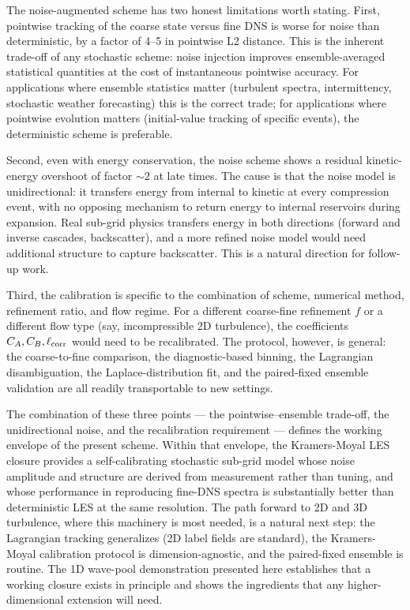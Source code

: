 \documentclass[11pt,letterpaper]{article}
\begin{document}
The noise-augmented scheme has two honest limitations worth stating. First, pointwise tracking of the coarse state versus fine DNS is worse for noise than deterministic, by a factor of 4--5 in pointwise L2 distance. This is the inherent trade-off of any stochastic scheme: noise injection improves ensemble-averaged statistical quantities at the cost of instantaneous pointwise accuracy. For applications where ensemble statistics matter (turbulent spectra, intermittency, stochastic weather forecasting) this is the correct trade; for applications where pointwise evolution matters (initial-value tracking of specific events), the deterministic scheme is preferable.

Second, even with energy conservation, the noise scheme shows a residual kinetic-energy overshoot of factor $\sim 2$ at late times. The cause is that the noise model is unidirectional: it transfers energy from internal to kinetic at every compression event, with no opposing mechanism to return energy to internal reservoirs during expansion. Real sub-grid physics transfers energy in both directions (forward and inverse cascades, backscatter), and a more refined noise model would need additional structure to capture backscatter. This is a natural direction for follow-up work.

Third, the calibration is specific to the combination of scheme, numerical method, refinement ratio, and flow regime. For a different coarse-fine refinement $f$ or a different flow type (say, incompressible 2D turbulence), the coefficients $C_A, C_B, \ell_{\rm corr}$ would need to be recalibrated. The protocol, however, is general: the coarse-to-fine comparison, the diagnostic-based binning, the Lagrangian disambiguation, the Laplace-distribution fit, and the paired-fixed ensemble validation are all readily transportable to new settings.

The combination of these three points --- the pointwise--ensemble trade-off, the unidirectional noise, and the recalibration requirement --- defines the working envelope of the present scheme. Within that envelope, the Kramers-Moyal LES closure provides a self-calibrating stochastic sub-grid model whose noise amplitude and structure are derived from measurement rather than tuning, and whose performance in reproducing fine-DNS spectra is substantially better than deterministic LES at the same resolution. The path forward to 2D and 3D turbulence, where this machinery is most needed, is a natural next step: the Lagrangian tracking generalizes (2D label fields are standard), the Kramers-Moyal calibration protocol is dimension-agnostic, and the paired-fixed ensemble is routine. The 1D wave-pool demonstration presented here establishes that a working closure exists in principle and shows the ingredients that any higher-dimensional extension will need.
\end{document}
